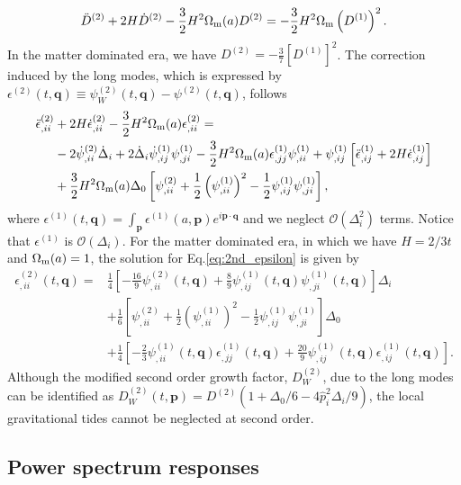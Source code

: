 \documentclass[a4paper,11pt]{article}
\newcommand{\vq}{{\bm q}}
\newcommand{\vp}{{\bm p}}
\begin{document}
\begin{align}
\ddot D^{(2)} + 2H \dot D^{(2)} - \frac32 H^2 \Omega_{\rm m}(a) D^{(2)} = -\frac32 H^2 \Omega_{\rm m}\left( D^{(1)} \right)^2.
\end{align}
In the matter dominated era, we have $D^{(2)}= -\frac37 \left[D^{(1)}\right]^2$.
The correction induced by the long modes, which is expressed by $\epsilon^{(2)}(t, \vq)\equiv \psi_W^{(2)}(t, \vq) - \psi^{(2)}(t, \vq)$, 
follows
\begin{align}
\ddot \epsilon^{(2)}_{,ii} &+ 2H \dot \epsilon^{(2)}_{,ii} - \frac32 H^2 \Omega_{\rm m}(a) \epsilon_{,ii}^{(2)}=
\nonumber\\
&-2\dot\psi^{(2)}_{,ii} \dot\Delta_i + 2\dot\Delta_i\dot\psi_{,ij}^{(1)}\psi_{,ji}^{(1)}
-\frac32 H^2 \Omega_{\rm m}(a) \epsilon^{(1)}_{,jj}\psi^{(1)}_{,ii} + \psi^{(1)}_{,ij} \left[ \ddot\epsilon_{,ij}^{(1)} + 2H\dot\epsilon_{,ij}^{(1)} \right]
\nonumber\\
&+\frac32 H^2 \Omega_{\rm m}(a)\Delta_0\left[ \psi_{,ii}^{(2)} + \frac12\left( \psi^{(1)}_{,ii}\right)^2- \frac12\psi^{(1)}_{,ij}\psi^{(1)}_{,ji} \right],
\label{eq:2nd_epsilon}
\end{align}
where $\epsilon^{(1)}(t,\vq) = \int_\vp \epsilon^{(1)}(a, \vp)e^{i\vp\cdot\vq}$
and we neglect $\mathcal{O}(\Delta_i^2)$ terms.
Notice that $\epsilon^{(1)}$ is $\mathcal{O}(\Delta_i)$.
For the matter dominated era, in which we have $H=2/3t$ and $\Omega_{\rm m}(a)=1$,
the solution for Eq.\eqref{eq:2nd_epsilon} is given by
\begin{align}
\epsilon^{(2)}_{,ii}(t, \vq)
=&\frac14 \left[-\frac{16}{9}\psi^{(2)}_{,ii}(t,\vq) + \frac89\psi^{(1)}_{,ij}(t,\vq)\psi^{(1)}_{,ji}(t,\vq) \right]\Delta_i
\nonumber\\
&+\frac16 \left[\psi_{,ii}^{(2)} + \frac12\left( \psi^{(1)}_{,ii}\right)^2- \frac12\psi^{(1)}_{,ij}\psi^{(1)}_{,ji}   \right]\Delta_0
\nonumber\\
&+\frac14\left[-\frac23\psi^{(1)}_{,ii}(t,\vq)\epsilon_{,jj}^{(1)}(t,\vq) + \frac{20}{9}\psi^{(1)}_{,ij}(t,\vq)\epsilon_{,ij}^{(1)}(t,\vq)  \right].
\end{align}
Although the modified second order growth factor, $D^{(2)}_W$, due to the long modes can be identified as $D^{(2)}_W (t, \vp) = D^{(2)}(1 + \Delta_0/6 - 4\hat{p}_i^2\Delta_i/9 )$, the local gravitational tides cannot be neglected at second order.


\subsection{Power spectrum responses}
\label{sub:resp}
\end{document}
